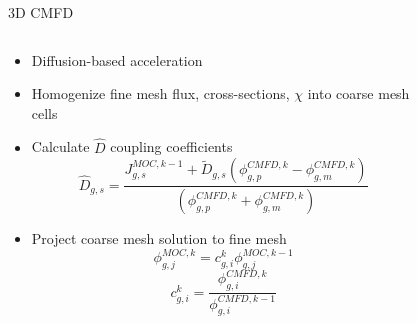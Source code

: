 \begin{frame}[t]{3D CMFD}
    
    \begin{columns}
      \begin{column}{0.6\textwidth}
        \begin{itemize}
          \item Diffusion-based acceleration
          \item Homogenize fine mesh flux, cross-sections, $\chi$ into coarse 
          mesh cells
          \item Calculate $\hat{D}$ coupling coefficients
          \begin{equation*}\scriptstyle
          \hat{D}_{g,s} = \frac{J_{g,s}^{MOC,k-1} + 
            \tilde{D}_{g,s}\left(\phi_{g,p}^{CMFD,k} - 
            \phi_{g,m}^{CMFD,k}\right)}{\left(\phi_{g,p}^{CMFD,k} + 
            \phi_{g,m}^{CMFD,k}\right)}
          \end{equation*}
          \item Project coarse mesh solution to fine mesh
          \begin{equation*}\scriptstyle
          \phi_{g,j}^{MOC,k} = c_{g,i}^k \phi_{g,j}^{MOC,k-1}
          \end{equation*}
          \begin{equation*}\scriptstyle
          c_{g,i}^k = \frac{\phi_{g,i}^{CMFD,k}}{\phi_{g,i}^{CMFD,k-1}}
          \end{equation*}
        \end{itemize}
      \end{column}
    \begin{column}{0.4\textwidth}
      \begin{figure}[h]
        \centering
        \resizebox{!}{0.7\textheight}{}
      \end{figure}
  \end{column}
  \end{columns}
    
\end{frame}


